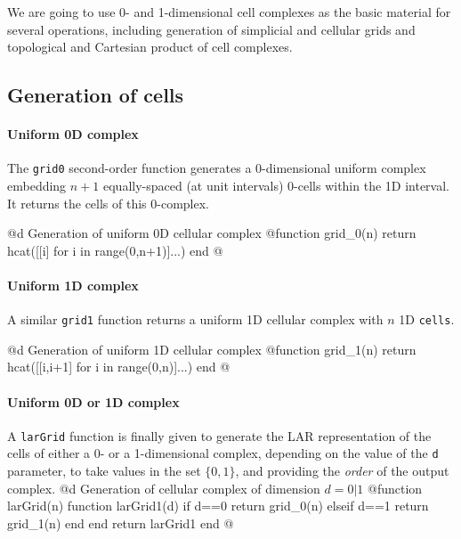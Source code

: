 We are going to use 0- and 1-dimensional cell complexes as the basic material for several operations, including generation of simplicial and cellular grids and topological and Cartesian product of cell complexes. 

\subsection{Generation of cells}

\paragraph{Uniform 0D complex}
The \texttt{grid0} second-order function generates a 0-dimensional uniform complex embedding $n+1$ equally-spaced (at unit intervals) 0-cells within the 1D interval. It returns the cells of this 0-complex.

@d Generation of uniform 0D cellular complex 
@{function grid_0(n)
    return hcat([[i] for i in range(0,n+1)]...)
end
@}

\paragraph{Uniform 1D complex}
A similar \texttt{grid1} function returns a uniform 1D cellular complex with $n$ 1D \texttt{cells}.

@d Generation of uniform 1D cellular complex 
@{function grid_1(n)
    return hcat([[i,i+1] for i in range(0,n)]...)
end
@}

\paragraph{Uniform 0D or 1D complex}
A \texttt{larGrid} function is finally given to generate the LAR representation of the cells of either a 0- or a 1-dimensional complex, depending on the value of the \texttt{d} parameter, to take values in the set $\{0,1\}$, and providing the \emph{order} of the output complex.
@d Generation of cellular complex of dimension $d = 0 | 1$
@{function larGrid(n)
    function larGrid1(d)
        if d==0 
        	return grid_0(n)
        elseif d==1 
        	return grid_1(n) 
        end
    end
    return larGrid1
end
@}



